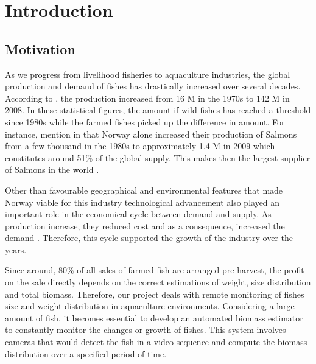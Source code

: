 \chapter{Introduction}
\label{chapter:Introduction}
 
\section{Motivation}
As we progress from livelihood fisheries to aquaculture industries, the global 
production and demand of fishes has drastically increased over several decades. 
According to \cite{Asche2011}, the production increased from 16 M in the 1970s to 
142 M in 2008. In these statistical figures, the amount if wild fishes has reached 
a threshold since 1980s while the farmed fishes picked up the difference in amount.
For instance, \citeauthor{LARSEN2011a} mention in \citeyearpar{LARSEN2011a} that Norway 
alone increased their production of Salmons from a few thousand in the 1980s to 
approximately 1.4 M in 2009 which constitutes around 51\% of the global supply. 
This makes then the largest supplier of Salmons in the world \citep{Asche2011, LARSEN2011a, Liu2011}.

Other than favourable geographical and environmental features that made Norway viable 
for this industry technological advancement also played an important role in the 
economical cycle between demand and supply. As production increase, they reduced 
cost and as a consequence, increased the demand \cite{Asche2011}. Therefore, this cycle 
supported the growth of the industry over the years.

Since around, 80\% of all sales of farmed fish are arranged pre-harvest, the profit 
on the sale directly depends on the correct estimations of weight, size distribution 
and total biomass. Therefore, our project deals with remote monitoring of fishes size 
and weight distribution in aquaculture environments. Considering a large amount of fish, 
it becomes essential to develop an automated biomass estimator to constantly monitor 
the changes or growth of fishes. This system involves cameras that would detect the 
fish in a video sequence and compute the biomass distribution over a specified period 
of time.

